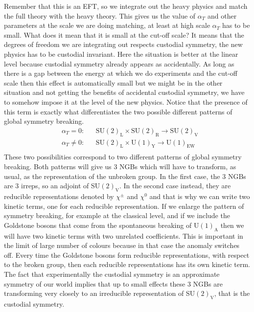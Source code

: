 \documentclass[../main.tex]{subfiles}
\begin{document}
Remember that this is an EFT, so we integrate out the heavy physics and match the full theory with the heavy theory. This gives us the value of $\alpha_T$ and other parameters at the scale we are doing matching, at least at high scale $\alpha_T$ has to be small. What does it mean that it is small at the cut-off scale? It means that the degrees of freedom we are integrating out respects custodial symmetry, the new physics has to be custodial invariant. Here the situation is better at the linear level because custodial symmetry already appears as accidentally. As long as there is a gap between the energy at which we do experiments and the cut-off scale then this effect is automatically small but we might be in the other situation and not getting the benefits of accidental custodial symmetry, we have to somehow impose it at the level of the new physics. Notice that the presence of this term is exactly what differentiates the two possible different patterns of global symmetry breaking.
\[
\begin{aligned}
&\alpha_T=0: &&\text{SU$(2)_{\text{L}}\times$SU$(2)_{\text{R}}\to$SU$(2)_{\text{V}}$}\\
&\alpha_T\neq0: &&\text{SU$(2)_{\text{L}}\times$U$(1)_{\text{Y}}\to$U$(1)_{\text{EW}}$}\\
\end{aligned}
\]
These two possibilities correspond to two different patterns of global symmetry breaking. Both patterns will give us 3 NGBs which will have to transform, as usual, as the representation of the unbroken group. In the first case, the 3 NGBs are 3 irreps, so an adjoint of SU$(2)_{\text{V}}$. In the second case instead, they are reducible representations denoted by $\chi^\pm$ and $\chi^0$ and that is why we can write two kinetic terms, one for each reducible representation. If we enlarge the pattern of symmetry breaking, for example at the classical level, and if we include the Goldstone bosons that come from the spontaneous breaking of U$(1)_{\text{A}}$ then we will have two kinetic terms with two unrelated coefficients. This is important in the limit of large number of colours because in that case the anomaly switches off. Every time the Goldstone bosons form reducible representations, with respect to the broken group, then each reducible representations has its own kinetic term. The fact that experimentally the custodial symmetry is an approximate symmetry of our world implies that up to small effects these 3 NGBs are transforming very closely to an irreducible representation of SU$(2)_{\text{V}}$, that is the custodial symmetry. 
\end{document}
